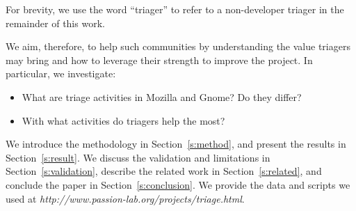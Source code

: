 \documentclass[conference]{IEEEtran}
\begin{document}
For brevity, we use the word ``triager'' to refer to a non-developer
triager in the remainder of this work.

\begin{comment}
In addition, the issue triage (often
referred to as bug triage) being a simpler task to start with for a new
contributor, may serve as bridge into
community and provide the chance to gradually learn the practice
and get fluent in more important tasks~\cite{MM10}.
However, \emph{there is no point of entry for triage, you basically
  are on your own}, as a respondent for this study complained.
It appears that the best practices of triage are still not well
understood, even in the most successful open source communities, and
triagers need guidelines on how to start contributing and how to
evaluate and improve their performance.
\end{comment}

We aim, therefore, to help such communities by understanding the
value triagers may bring and how to leverage their strength to
improve the project.  In particular, we investigate:
\begin{itemize}
\item What are triage activities in Mozilla and Gnome? Do they differ?
\item With what activities do triagers help the most?
\end{itemize}




We introduce the methodology in Section~\ref{s:method}, and
present the results in Section~\ref{s:result}. We discuss
the validation and limitations in Section~\ref{s:validation},
describe the related work in Section~\ref{s:related}, and conclude the
paper in Section~\ref{s:conclusion}.
We provide the data and scripts we used
at \emph{http://www.passion-lab.org/projects/triage.html}.
\end{document}
